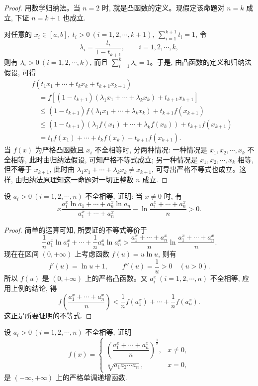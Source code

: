 \begin{proof}
用数学归纳法。当 $n=2$ 时, 就是凸函数的定义。现假定该命题对 $n=k$ 成立, 下证 $n=k+1$ 也成立.

对任意的 $x_i\in[a,b],\ t_i>0\ (i=1,2,\cdots,k+1),\ \sum_{i=1}^{k+1}t_i=1$, 令
\[
  \lambda_i=\frac{t_i}{1-t_{k+1}},\qquad i=1,2,\cdots,k,
\]
则有 $\lambda_i>0\ (i=1,2,\cdots,k)$, 而且 $\sum_{i=1}^k\lambda_i=1$。于是, 由凸函数的定义和归纳法假设, 可得
\[
\begin{aligned}
  &f(t_1x_1+\cdots+t_kx_k+t_{k+1}x_{k+1})\\
  &\quad=f[(1-t_{k+1})(\lambda_1x_1+\cdots+\lambda_kx_k)+t_{k+1}x_{k+1}]\\
  &\quad\leqslant(1-t_{k+1})f(\lambda_1x_1+\cdots+\lambda_kx_k)+t_{k+1}f(x_{k+1})\\
  &\quad\leqslant(1-t_{k+1})(\lambda_1f(x_1)+\cdots+\lambda_kf(x_k))+t_{k+1}f(x_{k+1})\\
  &\quad=t_1f(x_1)+\cdots+t_kf(x_k)+t_{k+1}f(x_{k+1}).
\end{aligned}
\]
当 $f(x)$ 为严格凸函数且 $x_i$ 不全相等时, 分两种情况: 一种情况是 $x_1,x_2,\cdots,x_k$ 不全相等, 此时由归纳法假设, 可知严格不等式成立; 另一种情况是 $x_1,x_2,\cdots,x_k$ 相等, 但不等于 $x_{k+1}$, 此时由 $\lambda_1x_1+\cdots+\lambda_kx_k\ne x_{k+1}$, 可导出严格不等式也成立。这样, 由归纳法原理知这一命题对一切正整数 $n$ 成立.
\end{proof}


\begin{example}\label{example:ma-5-4-9}
设 $a_i>0\ (i=1,2,\cdots,n)$ 不全相等, 证明: 当 $x\ne0$ 时, 有
\[
  x\frac{a_1^x\ln a_1+\cdots+a_n^x\ln a_n}{a_1^x+\cdots+a_n^x}
  -\ln\frac{a_1^x+\cdots+a_n^x}{n}>0.
\]
\end{example}


\begin{proof}
简单的运算可知, 所要证的不等式等价于
\[
  \frac1n a_1^x\ln a_1^x+\cdots+\frac1n a_n^x\ln a_n^x
  >\frac{a_1^x+\cdots+a_n^x}{n}\ln\frac{a_1^x+\cdots+a_n^x}{n}.
\]
现在在区间 $(0,+\infty)$ 上考虑函数 $f(u)=u\ln u$, 则有
\[
  f'(u)=\ln u+1,\qquad f''(u)=\frac1u>0\quad (u>0).
\]
所以 $f(u)$ 是 $(0,+\infty)$ 上的严格凸函数。又 $a_i^x\ (i=1,2,\cdots,n)$ 不全相等, 应用上例的结论, 得
\[
  f\left(\frac{a_1^x+\cdots+a_n^x}{n}\right)
  <\frac1n f(a_1^x)+\cdots+\frac1n f(a_n^x).
\]
这正是所要证明的不等式.
\end{proof}


\begin{example}\label{example:ma-5-4-10}
设 $a_i>0\ (i=1,2,\cdots,n)$ 不全相等, 证明
\[
  f(x)=
  \begin{cases}
    \left(\dfrac{a_1^x+\cdots+a_n^x}{n}\right)^{\frac1x}, & x\ne0,\\[6pt]
    \sqrt[n]{a_1a_2\cdots a_n}, & x=0,
  \end{cases}
\]
是 $(-\infty,+\infty)$ 上的严格单调递增函数.
\end{example}


